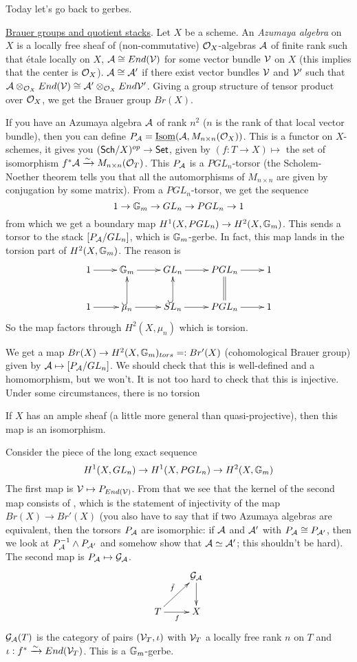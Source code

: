 
Today let's go back to gerbes.

\underline{Brauer groups and quotient stacks}. Let $X$ be a scheme.
An \emph{Azumaya algebra} on $X$ is a locally free sheaf of
(non-commutative) $\mathcal{O}_X$-algebras $\mathcal{A}$ of finite rank such that
\'etale locally on $X$, $\mathcal{A}\cong End(\mathcal{V})$ for some vector bundle $\mathcal{V}$
on $X$ (this implies that the center is $\mathcal{O}_X$). $\mathcal{A}\cong \mathcal{A}'$ if
there exist vector bundles $\mathcal{V}$ and $\mathcal{V}'$ such that $\mathcal{A}\otimes_{\mathcal{O}_X}
End(\mathcal{V})\cong \mathcal{A}'\otimes_{\mathcal{O}_X}End{\mathcal{V}'}$. Giving a group structure of
tensor product over $\mathcal{O}_X$, we get the Brauer group $Br(X)$.

If you have an Azumaya algebra $\mathcal{A}$ of rank $n^2$ ($n$ is the rank of
that local vector bundle), then you can define
$P_{\mathcal{A}}=\operatorname{\underline{Isom}}(\mathcal{A},M_{n\times n}(\mathcal{O}_X))$. This is a functor on
$X$-schemes, it gives you $(\text{\sf Sch}/X)^{op}\to \text{\sf Set}$, given by $(f:T\to
X)\mapsto $ the set of isomorphism $f^*\mathcal{A}\xrightarrow\sim M_{n\times
n}(\mathcal{O}_T)$. This $P_{\mathcal{A}}$ is a $PGL_n$-torsor (the Scholem-Noether
theorem tells you that all the automorphisms of $M_{n\times n}$ are
given by conjugation by some matrix). From a $PGL_n$-torsor, we get
the sequence
\[
  1\to \mathbb{G}_m \to GL_n\to PGL_n\to 1
\]
from which we get a boundary map $H^1(X,PGL_n)\to H^2(X,\mathbb{G}_m)$. This
sends a torsor to the stack $[P_{\mathcal{A}}/GL_n]$, which is $\mathbb{G}_m$-gerbe. In
fact, this map lands in the torsion part of $H^2(X,\mathbb{G}_m)$. The
reason is
\[\xymatrix{
  1\ar[r] & \GG_m \ar[r] & GL_n \ar[r] & PGL_n\ar[r] & 1\\
  1 \ar[r] & \mu_n \ar[r]\ar@{^(->}[u] & SL_n \ar[r]\ar@{^(->}[u]&
PGL_n \ar[r]\ar@{=}[u] & 1
}\]
So the map factors through $H^2(X,\mu_n)$ which is torsion.

We get a map $Br(X)\to H^2(X,\mathbb{G}_m)_{tors}=:Br'(X)$ (cohomological
Brauer group) given by $\mathcal{A}\mapsto [P_{\mathcal{A}}/GL_n]$. We should check that
this is well-defined and a homomorphism, but we won't. It is not too
hard to check that this is injective. Under some circumstances, there
is no torsion 
\begin{theorem}[Gabber]
  If $X$ has an ample sheaf (a little more general than
quasi-projective), then this map is an isomorphism.
\end{theorem}
Consider the piece of the long exact sequence
\[
  H^1(X,GL_n)\to H^1(X,PGL_n)\to H^2(X,\mathbb{G}_m)
\]
The first map is $\mathcal{V}\mapsto P_{End(\mathcal{V})}$. From that we see that the
kernel of the second map consists of \anton{}, which is the statement
of injectivity of the map $Br(X)\to Br'(X)$ (you also have to say
that if two Azumaya algebras are equivalent, then the torsors $P_{\mathcal{A}}$
are isomorphic: if $\mathcal{A}$ and $\mathcal{A}'$ with $P_{\mathcal{A}}\cong P_{\mathcal{A}'}$, then we
look at $P_{\mathcal{A}}^{-1}\wedge P_{\mathcal{A}'}$ and somehow show that
$\mathcal{A}\simeq\mathcal{A}'$; this shouldn't be hard). The second map is
$P_{\mathcal{A}}\mapsto \mathcal{G}_{\mathcal{A}}$.
\[\xymatrix{
  & \G_\A \ar[d]\\
  T \ar[r]_f\ar[ur]^{\tilde f} & X
}\]
$\mathcal{G}_{\mathcal{A}}(T)$ is the category of pairs $(\mathcal{V}_T,\iota)$ with $\mathcal{V}_T$ a
locally free rank $n$ on $T$ and $\iota:f^*\xrightarrow\sim
End(\mathcal{V}_T)$. This is a $\mathbb{G}_m$-gerbe.

